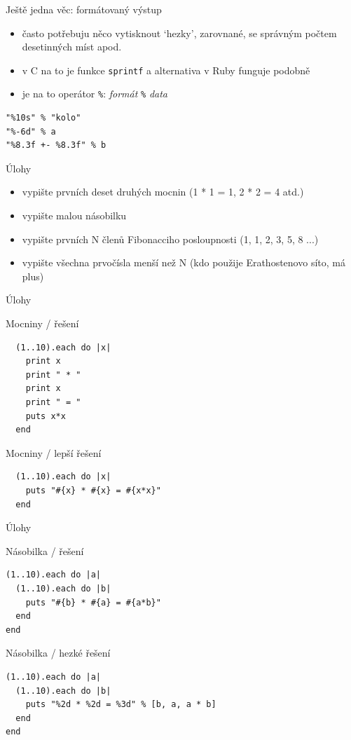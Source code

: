 \documentclass{beamer}
\begin{document}
\begin{frame}[fragile]{Ještě jedna věc: formátovaný výstup}
  \begin{itemize}
    \item často potřebuju něco vytisknout `hezky', zarovnané, se správným počtem desetinných míst apod.
    \item v C na to je funkce \texttt{sprintf} a alternativa v Ruby funguje podobně
    \item je na to operátor \texttt{\%}: \emph{formát} \texttt{\%} \emph{data}
  \end{itemize}
  {\small
  \begin{verbatim}
"%10s" % "kolo"
"%-6d" % a
"%8.3f +- %8.3f" % b
  \end{verbatim}
  }
\end{frame}

\begin{frame}{Úlohy}
  \begin{itemize}
    \item vypište prvních deset druhých mocnin (1 * 1 = 1, 2 * 2 = 4 atd.)
    \item vypište malou násobilku
    \item vypište prvních N členů Fibonacciho posloupnosti (1, 1, 2, 3, 5, 8 ...)
    \item vypište všechna prvočísla menší než N (kdo použije Erathostenovo síto, má plus)
  \end{itemize}
\end{frame}

\begin{frame}[fragile]{Úlohy}
  \begin{block}{Mocniny / řešení}
\begin{verbatim}
  (1..10).each do |x|
    print x
    print " * "
    print x
    print " = "
    puts x*x
  end
\end{verbatim}
  \end{block}
  \pause
  \begin{block}{Mocniny / lepší řešení}
\begin{verbatim}
  (1..10).each do |x|
    puts "#{x} * #{x} = #{x*x}"
  end
\end{verbatim}
  \end{block}
\end{frame}

\begin{frame}[fragile]{Úlohy}
  \begin{block}{Násobilka / řešení}
\begin{verbatim}
(1..10).each do |a|
  (1..10).each do |b|
    puts "#{b} * #{a} = #{a*b}"
  end
end
\end{verbatim}
  \end{block}
  \pause
  \begin{block}{Násobilka / hezké řešení}
\begin{verbatim}
(1..10).each do |a|
  (1..10).each do |b|
    puts "%2d * %2d = %3d" % [b, a, a * b]
  end
end
\end{verbatim}
  \end{block}
\end{frame}
\end{document}
